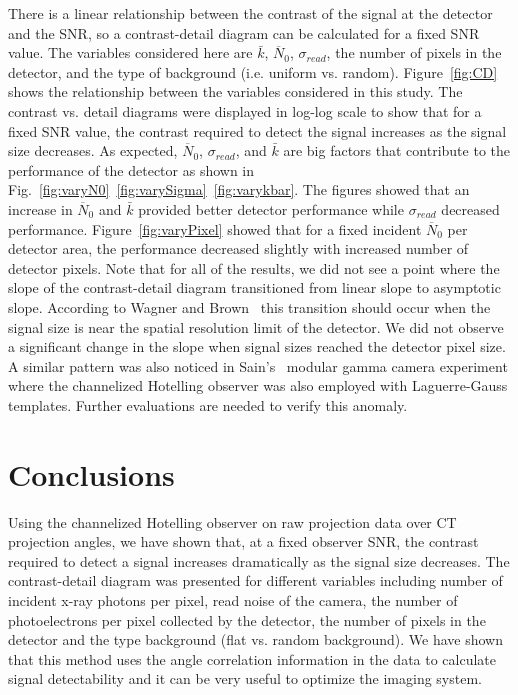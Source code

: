 %
%
There is a linear relationship between the contrast of the signal at the detector and the SNR, so a contrast-detail diagram can be calculated for a fixed SNR value.  The variables considered here are $\bar{k}$, $\overline{N}_0$, $\sigma_{read}$, the number of pixels in the detector, and the type of background (i.e. uniform vs. random).  Figure~\ref{fig:CD} shows the relationship between the variables considered in this study.  The contrast vs. detail diagrams were displayed in log-log scale to show that for a fixed SNR value, the contrast required to detect the signal increases as the signal size decreases.  As expected, $\overline{N}_0$, $\sigma_{read}$, and $\bar{k}$ are big factors that contribute to the performance of the detector as shown in Fig.~\ref{fig:varyN0}~\ref{fig:varySigma}~\ref{fig:varykbar}.  The figures showed that an increase in  $\overline{N}_0$ and $\bar{k}$ provided better detector performance while $\sigma_{read}$ decreased performance.  Figure~\ref{fig:varyPixel} showed that for a fixed incident $\overline{N}_0$ per detector area, the performance decreased slightly with increased number of detector pixels.  Note that for all of the results, we did not see a point where the slope of the contrast-detail diagram transitioned from linear slope to asymptotic slope. According to Wagner and Brown~\citep{Wagner1979} this transition should occur when the signal size is near the spatial resolution limit of the detector.  We did not observe a significant change in the slope when signal sizes reached the detector pixel size.  A similar pattern was also noticed in Sain's~\citep{Sain2003} modular gamma camera experiment where the channelized Hotelling observer was also employed with Laguerre-Gauss templates.  Further evaluations are needed to verify this anomaly.

\section{Conclusions}
Using the channelized Hotelling observer on raw projection data over CT projection angles, we have shown that, at a fixed observer SNR, the contrast required to detect a signal increases dramatically as the signal size decreases.  The contrast-detail diagram was presented for different variables including number of incident x-ray photons per pixel, read noise of the camera, the number of photoelectrons per pixel collected by the detector, the number of pixels in the detector and the type background (flat vs. random background).  We have shown that this method uses the angle correlation information in the data to calculate signal detectability and it can be very useful to optimize the imaging system.